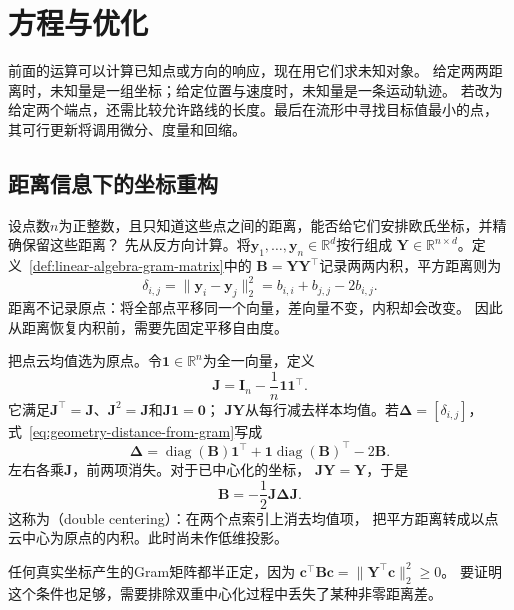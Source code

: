 \section{方程与优化}
\label{sec:geometry-equations-optimization}

前面的运算可以计算已知点或方向的响应，现在用它们求未知对象。
给定两两距离时，未知量是一组坐标；给定位置与速度时，未知量是一条运动轨迹。
若改为给定两个端点，还需比较允许路线的长度。最后在流形中寻找目标值最小的点，
其可行更新将调用微分、度量和回缩。

\subsection{距离信息下的坐标重构}
\label{sec:geometry-distance-coordinate-embedding}

设点数$n$为正整数，且只知道这些点之间的距离，能否给它们安排欧氏坐标，并精确保留这些距离？
先从反方向计算。将$\bm y_1,\ldots,\bm y_n\in\mathbb R^d$按行组成
$\bm Y\in\mathbb R^{n\times d}$。定义~\ref{def:linear-algebra-gram-matrix}中的
$\bm B=\bm Y\bm Y^\top$记录两两内积，平方距离则为
\begin{equation}
  \delta_{i,j}=\lVert\bm y_i-\bm y_j\rVert_2^2
  =b_{i,i}+b_{j,j}-2b_{i,j}.
  \label{eq:geometry-distance-from-gram}
\end{equation}
距离不记录原点：将全部点平移同一个向量，差向量不变，内积却会改变。
因此从距离恢复内积前，需要先固定平移自由度。

把点云均值选为原点。令$\bm1\in\mathbb R^n$为全一向量，定义
\begin{equation}
  \bm J=\bm I_n-\frac1n\bm1\bm1^\top.
  \label{eq:geometry-centering-matrix}
\end{equation}
它满足$\bm J^\top=\bm J$、$\bm J^2=\bm J$和$\bm J\bm1=\bm0$；
$\bm J\bm Y$从每行减去样本均值。若$\bm\Delta=[\delta_{i,j}]$，
式~\eqref{eq:geometry-distance-from-gram}写成
\[
  \bm\Delta=\operatorname{diag}(\bm B)\bm1^\top
  +\bm1\operatorname{diag}(\bm B)^\top-2\bm B.
\]
左右各乘$\bm J$，前两项消失。对于已中心化的坐标，
$\bm J\bm Y=\bm Y$，于是
\begin{equation}
  \bm B=-\frac12\bm J\bm\Delta\bm J.
  \label{eq:geometry-double-centering}
\end{equation}
这称为（double centering）：在两个点索引上消去均值项，
把平方距离转成以点云中心为原点的内积。此时尚未作低维投影。

任何真实坐标产生的Gram矩阵都半正定，因为
$\bm c^\top\bm B\bm c=\lVert\bm Y^\top\bm c\rVert_2^2\geq0$。
要证明这个条件也足够，需要排除双重中心化过程中丢失了某种非零距离差。

